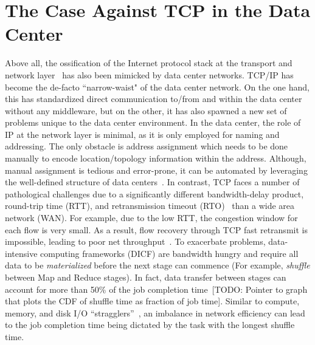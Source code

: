 \documentclass[a4paper,12pt,twoside,openright]{report}
\begin{document}
\section{The Case Against TCP in the Data Center}
Above all, the ossification of the Internet protocol stack at the transport and
network layer~\cite{Akhshabi:2011:ELP} has also been mimicked by data center
networks. TCP/IP has become the de-facto ``narrow-waist" of the data center
network. On the one hand, this has standardized direct communication to/from and
within the data center without any middleware, but on the other, it has also
spawned a new set of problems unique to the data center environment. In the data
center, the role of IP at the network layer is minimal, as it is only employed
for naming and addressing. The only obstacle is address assignment which needs
to be done manually to encode location/topology information within the address.
Although, manual assignment is tedious and error-prone, it can be automated by
leveraging the well-defined structure of data centers~\cite{Chen:2010:GAA}. In
contrast, TCP faces a number of pathological challenges due to a significantly
different bandwidth-delay product, round-trip time (RTT), and retransmission
timeout (RTO)~\cite{Chen:2009:UTI} than a wide area network (WAN). For example,
due to the low RTT, the congestion window for each flow is very small. As a
result, flow recovery through TCP fast retransmit is impossible, leading to poor
net throughput~\cite{Kandula:2009:NDC}. To exacerbate problems, data-intensive
computing frameworks (DICF) are bandwidth hungry and require all data to be
\emph{materialized} before the next stage can commence (For example,
\emph{shuffle} between Map and Reduce stages). In fact, data transfer between
stages can account for more than 50\% of the job completion
time~\cite{Chowdhury:2011:MDT}\textsf{[TODO: Pointer to graph that plots the CDF
of shuffle time as fraction of job time]}.
Similar to compute, memory, and disk I/O ``stragglers''~\cite{Zaharia:2008:IMP},
an imbalance in network efficiency can lead to the job completion time being
dictated by the task with the longest shuffle time.
\end{document}
